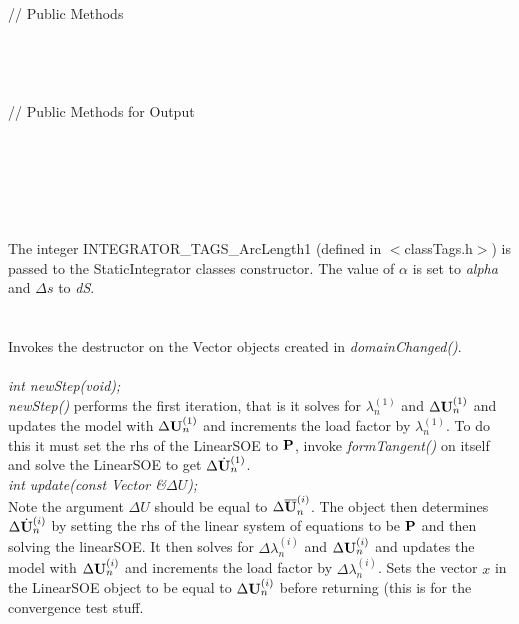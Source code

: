 \indent // Public Methods \\
 \\
 \\
\\ \\
\indent // Public Methods for Output\\
\\ 
\\ 
\\

 \\
\\ \\
The integer INTEGRATOR\_TAGS\_ArcLength1 (defined in
$<$classTags.h$>$) is passed to the StaticIntegrator classes
constructor. The value of $\alpha$ is set to {\em alpha} and 
$\Delta s$ to {\em dS}. \\

 \\
\\ 
Invokes the destructor on the Vector objects created in {\em
domainChanged()}. \\

\\

{\em int newStep(void);} \\
{\em newStep()} performs the first iteration, that is it solves for 
$\lambda_n^{(1)}$ and $\Delta \U_n^{(1)}$ and updates the model with
$\Delta \U_n^{(1)}$ and increments the load factor by
$\lambda_n^{(1)}$. To do this it must set the rhs of the LinearSOE to
$\P$, invoke {\em formTangent()} on itself and solve the LinearSOE to
get $\Delta \Uh_n^{(1)}$. \\

{\em int update(const Vector \&$\Delta U$);} \\
Note the argument $\Delta U$ should be equal to $\Delta \Ub_n^{(i)}$.
The object then determines $\Delta \Uh_n^{(i)}$ by setting the rhs of
the linear system of equations to be $\P$ and then solving the
linearSOE. It then solves for
$\Delta \lambda_n^{(i)}$ and $\Delta \U_n^{(i)}$ and updates the model with
$\Delta \U_n^{(i)}$ and increments the load factor by $\Delta
\lambda_n^{(i)}$. Sets the vector $x$ in the LinearSOE object to be
equal to $\Delta \U_n^{(i)}$ before returning (this is for the
convergence test stuff. \\


